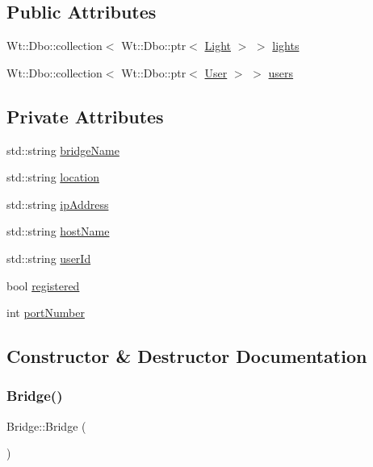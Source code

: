 \subsection*{Public Attributes}
\begin{DoxyCompactItemize}
\item 
Wt\+::\+Dbo\+::collection$<$ Wt\+::\+Dbo\+::ptr$<$ \hyperlink{class_light}{Light} $>$ $>$ \hyperlink{class_bridge_ad2dbc05744f877c628f08ddadb84b035}{lights}
\item 
Wt\+::\+Dbo\+::collection$<$ Wt\+::\+Dbo\+::ptr$<$ \hyperlink{class_user}{User} $>$ $>$ \hyperlink{class_bridge_a84dbab519260e2e4edd8d40803b1ceec}{users}
\end{DoxyCompactItemize}
\subsection*{Private Attributes}
\begin{DoxyCompactItemize}
\item 
std\+::string \hyperlink{class_bridge_ac51c80c843b4df25faf5fa426e89811f}{bridge\+Name}
\item 
std\+::string \hyperlink{class_bridge_a04f9fec6433cadffde5fda71a004af96}{location}
\item 
std\+::string \hyperlink{class_bridge_a7e277fedd8e5d755f58c02a0f1c2bf80}{ip\+Address}
\item 
std\+::string \hyperlink{class_bridge_a6a1ca8cc945fcd364e8147188930b304}{host\+Name}
\item 
std\+::string \hyperlink{class_bridge_a99b5742c2e826c016d6e1ed2fdb2f542}{user\+Id}
\item 
bool \hyperlink{class_bridge_aad587c8a2b91ebf99d45ad9960409041}{registered}
\item 
int \hyperlink{class_bridge_af3ffbbc8063a22a9562600a098ac9109}{port\+Number}
\end{DoxyCompactItemize}


\subsection{Constructor \& Destructor Documentation}
\mbox{\label{class_bridge_a275f54dafc95c9b5bbaba5e904c4fa9a}} 
\subsubsection{\texorpdfstring{Bridge()}{Bridge()}}
{\footnotesize\ttfamily Bridge\+::\+Bridge (\begin{DoxyParamCaption}{ }\end{DoxyParamCaption})\hspace{0.3cm}{\ttfamily [inline]}}


